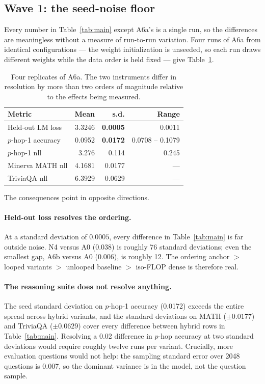 \documentclass[11pt,a4paper]{article}
\begin{document}
\subsection{Wave 1: the seed-noise floor}

Every number in Table~\ref{tab:main} except A6a's is a single run, so the differences are
meaningless without a measure of run-to-run variation. Four runs of A6a from identical
configurations --- the weight initialization is unseeded, so each run draws different weights while
the data order is held fixed --- give Table~\ref{tab:noise}.

\begin{table}[h]
\centering
\begin{tabular}{lrrr}
\toprule
Metric & Mean & s.d. & Range \\
\midrule
Held-out LM loss        & 3.3246 & \textbf{0.0005} & 0.0011 \\
$p$-hop-1 accuracy      & 0.0952 & \textbf{0.0172} & 0.0708 -- 0.1079 \\
$p$-hop-1 nll           & 3.276  & 0.114  & 0.245 \\
Minerva MATH nll        & 4.1681 & 0.0177 & --- \\
TriviaQA nll            & 6.3929 & 0.0629 & --- \\
\bottomrule
\end{tabular}
\caption{Four replicates of A6a. The two instruments differ in resolution by more than two orders
of magnitude relative to the effects being measured.}
\label{tab:noise}
\end{table}

The consequences point in opposite directions.

\paragraph{Held-out loss resolves the ordering.} At a standard deviation of $0.0005$, every
difference in Table~\ref{tab:main} is far outside noise. N4 versus A0 (0.038) is roughly 76 standard
deviations; even the smallest gap, A6b versus A0 (0.006), is roughly 12. The ordering
anchor $>$ looped variants $>$ unlooped baseline $>$ iso-FLOP dense is therefore real.

\paragraph{The reasoning suite does not resolve anything.} The seed standard deviation on
$p$-hop-1 accuracy (0.0172) exceeds the entire spread across hybrid variants, and the standard
deviations on MATH ($\pm0.0177$) and TriviaQA ($\pm0.0629$) cover every difference between hybrid
rows in Table~\ref{tab:main}. Resolving a 0.02 difference in $p$-hop accuracy at two standard
deviations would require roughly twelve runs per variant. Crucially, more evaluation questions
would not help: the sampling standard error over 2048 questions is 0.007, so the dominant variance
is in the model, not the question sample.
\end{document}

